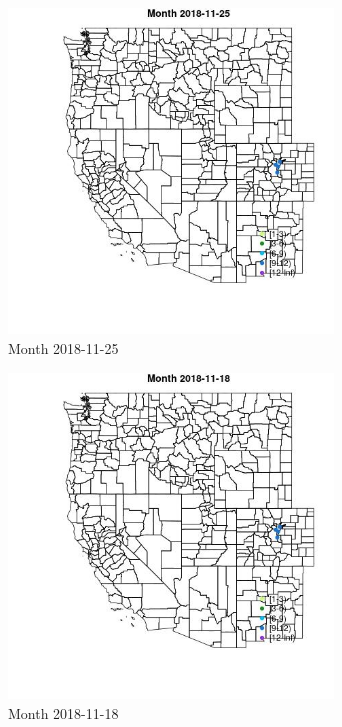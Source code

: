 \begin{figure} 
\centering  
\includegraphics[width=0.77\textwidth]{Code_Outputs/Report_ML_input_PM25_Step4_part_e_de_duplicated_aveswNAs_MapObsMonth2018-11-25.jpg} 
\caption{\label{fig:Report_ML_input_PM25_Step4_part_e_de_duplicated_aveswNAsMapObsMonth2018-11-25}Month 2018-11-25} 
\end{figure} 
 

\begin{figure} 
\centering  
\includegraphics[width=0.77\textwidth]{Code_Outputs/Report_ML_input_PM25_Step4_part_e_de_duplicated_aveswNAs_MapObsMonth2018-11-18.jpg} 
\caption{\label{fig:Report_ML_input_PM25_Step4_part_e_de_duplicated_aveswNAsMapObsMonth2018-11-18}Month 2018-11-18} 
\end{figure} 
 

